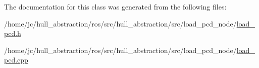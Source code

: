 The documentation for this class was generated from the following files\+:\begin{DoxyCompactItemize}
\item 
/home/jc/hull\+\_\+abstraction/ros/src/hull\+\_\+abstraction/src/load\+\_\+pcd\+\_\+node/\hyperlink{load__pcd_8h}{load\+\_\+pcd.\+h}\item 
/home/jc/hull\+\_\+abstraction/ros/src/hull\+\_\+abstraction/src/load\+\_\+pcd\+\_\+node/\hyperlink{load__pcd_8cpp}{load\+\_\+pcd.\+cpp}\end{DoxyCompactItemize}
